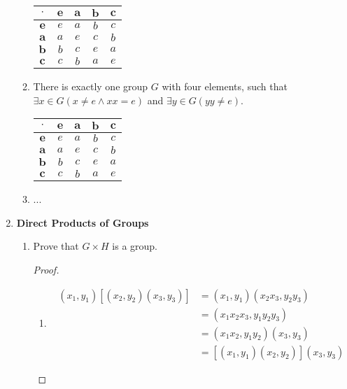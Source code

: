 \begin{enumerate}[label={\Alph*.},font={\bfseries}]
\begin{enumerate}[label={\arabic*},font={\bfseries}]
    \begin{tabular}{ c | c c c c }
      $\cdot$ & $\mathbf{e}$ & $\mathbf{a}$ & $\mathbf{b}$ & $\mathbf{c}$  \\
      \hline
      $\mathbf{e}$ & $e$ & $a$ & $b$ & $c$ \\
      $\mathbf{a}$ & $a$ & $e$ & $c$ & $b$ \\
      $\mathbf{b}$ & $b$ & $c$ & $e$ & $a$ \\
      $\mathbf{c}$ & $c$ & $b$ & $a$ & $e$
    \end{tabular}
  \item There is exactly one group $G$ with four elements, such that $\exists x \in G (x \ne e \land xx = e)$ and
    $\exists y \in G (yy \ne e)$.
    \begin{tabular}{ c | c c c c }
      $\cdot$ & $\mathbf{e}$ & $\mathbf{a}$ & $\mathbf{b}$ & $\mathbf{c}$  \\
      \hline
      $\mathbf{e}$ & $e$ & $a$ & $b$ & $c$ \\
      $\mathbf{a}$ & $a$ & $e$ & $c$ & $b$ \\
      $\mathbf{b}$ & $b$ & $c$ & $e$ & $a$ \\
      $\mathbf{c}$ & $c$ & $b$ & $a$ & $e$
    \end{tabular}
    \item ...
  \end{enumerate}
\item {\bf Direct Products of Groups}
  \begin{enumerate}[label={\arabic*},font={\bfseries}]
  \item Prove that $G \times H$ is a group.
    \begin{proof}
      \ \\
      \begin{enumerate}[label={(G\arabic*)}]
      \item
        \begin{align*}
          (x_1,y_1)\left[(x_2,y_2)(x_3,y_3)\right] &= (x_1,y_1)(x_2x_3,y_2y_3) \\
          &= (x_1x_2x_3,y_1y_2y_3) \\
          &= (x_1x_2,y_1y_2)(x_3,y_3) \\
          &= \left[(x_1,y_1)(x_2,y_2)\right](x_3,y_3)

\end{align*}
\end{enumerate}
\end{proof}
\end{enumerate}
\end{enumerate}
